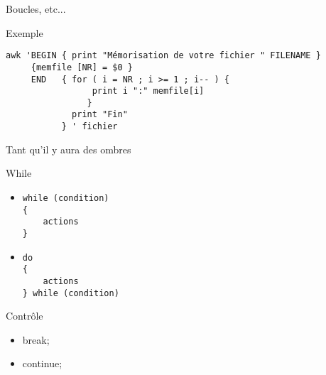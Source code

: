 \def\ftitle{Boucles, etc...}
\begin{frame}[containsverbatim]{\ftitle}
\def\blocktitle{Exemple}
\begin{block}{\blocktitle}
\begin{verbatim}
awk 'BEGIN { print "Mémorisation de votre fichier " FILENAME }
     {memfile [NR] = $0 }
     END   { for ( i = NR ; i >= 1 ; i-- ) {
                 print i ":" memfile[i]
                }
             print "Fin"
           } ' fichier 
\end{verbatim}%
\end{block}
\end{frame}


\def\ftitle{Tant qu'il y aura des ombres}
\begin{frame}[containsverbatim]{\ftitle}
\def\blocktitle{While}
\begin{block}{\blocktitle}
\begin{itemize}
\item \begin{verbatim}
while (condition)
{
	actions
}
\end{verbatim}
\item \begin{verbatim}
do
{
	actions
} while (condition)
\end{verbatim}
\end{itemize}
\end{block}
\def\blocktitle{Contrôle}
\begin{block}{\blocktitle}
\begin{itemize}
\item break;
\item continue;
\end{itemize}
\end{block}
\end{frame}


